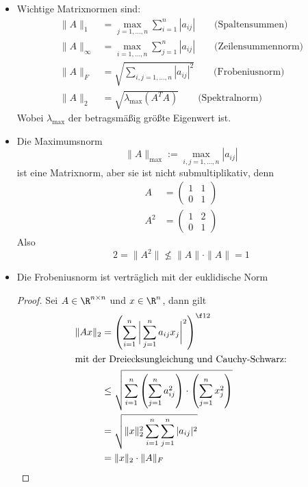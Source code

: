 \documentclass[a4paper]{scrartcl}
\numberwithin{equation}{section}
\begin{document}
\begin{ex}

\begin{itemize}
\item
	Wichtige Matrixnormen sind:
\label{ex:2.11}
\begin{align*}
\|A\|_1 &= \max_{j=1,\dotsc,n}\sum_{i=1}^n|a_{ij}| \qquad \text{(Spaltensummen)}\\
\|A\|_\infty &= \max_{i=1,\dotsc,n}\sum_{j=1}^n|a_{ij}| \qquad \text{(Zeilensummennorm)}\\
\|A\|_F &= \sqrt{\sum_{i,j=1,\dotsc,n}|a_{ij}|^2} \qquad \text{(Frobeniusnorm)}\\ 
\|A\|_2 &= \sqrt{\lambda_{\text{max}}(A^TA)} \qquad \text{(Spektralnorm)}
\end{align*}
Wobei $\lambda_{\text{max}}$ der betragsmäßig größte Eigenwert ist.

\item
	Die Maximumsnorm
\[
	\|A\|_{\text{max}}:=\max_{i,j=1,\dotsc,n}|a_{ij}| 
\]
ist eine Matrixnorm, aber sie ist nicht submultiplikativ, denn
\begin{align*}
A&=\begin{pmatrix}1&1\\0&1\end{pmatrix}\\
A^2&=\begin{pmatrix}1&2\\0&1\end{pmatrix}
\end{align*}
Also
\[
2=\|A^2\|\not\le \|A\|\cdot\|A\|=1
\]

\item
Die Frobeniusnorm ist verträglich mit der euklidische Norm
\begin{proof}
	Sei $A\in \R^{n\times n}$ und $x\in \R^n$, dann gilt
	\begin{align*}
		\|Ax\|_2&=\left(\sum_{i=1}^n\bigg|\sum_{j=1}^na_{ij}x_j\bigg|^2\right)^{\f 12}\\
		\intertext{mit der Dreiecksungleichung und Cauchy-Schwarz:}
		&\le \sqrt{\sum_{i=1}^n\left(\sum_{j=1}^na_{ij}^2\right)\cdot\left(\sum_{j=1}^nx_j^2\right)}\\
		&=\sqrt{\|x\|_2^2\sum_{i=1}^n\sum_{j=1}^n|a_{ij}|^2}\\
		&= \|x\|_2\cdot \|A\|_F 
	\end{align*}
\end{proof}
\end{itemize}
\end{ex}
\end{document}
